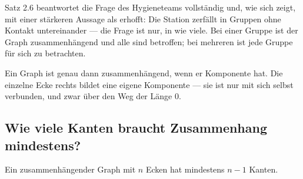 \begin{merksatz}
\begin{center}
\begin{minipage}{0.9\textwidth}
Satz 2.6 beantwortet die Frage des Hygieneteams vollständig und, wie sich zeigt, mit einer stärkeren Aussage als erhofft: Die Station zerfällt  in Gruppen ohne Kontakt untereinander --- die Frage ist nur, in wie viele. Bei einer Gruppe ist der Graph zusammenhängend und alle sind betroffen; bei mehreren ist jede Gruppe für sich zu betrachten.
\end{minipage}
\end{center}

\begin{center}
\end{center}

Ein Graph ist genau dann zusammenhängend, wenn er  Komponente hat. Die einzelne Ecke rechts bildet eine eigene Komponente --- sie ist nur mit sich selbst verbunden, und zwar über den Weg der Länge $0$.
\end{merksatz}

\subsection*{Wie viele Kanten braucht Zusammenhang mindestens?}

\begin{merksatz}
Ein zusammenhängender Graph mit $n$ Ecken hat mindestens $n-1$ Kanten.
\end{merksatz}

